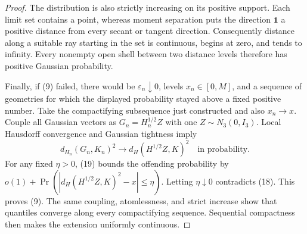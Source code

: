 \documentclass{article}
\begin{document}
\begin{proof}
The distribution is also strictly increasing on its positive support.  Each limit set contains a point, whereas moment separation puts the direction \(\mathbf1\) a positive distance from every secant or tangent direction.  Consequently distance along a suitable ray starting in the set is continuous, begins at zero, and tends to infinity.  Every nonempty open shell between two distance levels therefore has positive Gaussian probability.

Finally, if (9) failed, there would be \(\varepsilon_n\downarrow0\), levels \(x_n\in[0,M]\), and a sequence of geometries for which the displayed probability stayed above a fixed positive number.  Take the compactifying subsequence just constructed and also \(x_n\to x\).  Couple all Gaussian vectors as \(G_n=H_n^{1/2}Z\) with one \(Z\sim N_3(0,I_3)\).  Local Hausdorff convergence and Gaussian tightness imply
\[
 d_{H_n}(G_n,K_n)^2\longrightarrow d_H(H^{1/2}Z,K)^2
 \quad\text{in probability}.                                                 \tag{19}
\]
For any fixed \(\eta>0\), (19) bounds the offending probability by \(o(1)+\Pr(|d_H(H^{1/2}Z,K)^2-x|\le\eta)\).  Letting \(\eta\downarrow0\) contradicts (18).  This proves (9).  The same coupling, atomlessness, and strict increase show that quantiles converge along every compactifying sequence.  Sequential compactness then makes the extension uniformly continuous.
\end{proof}
\end{document}
